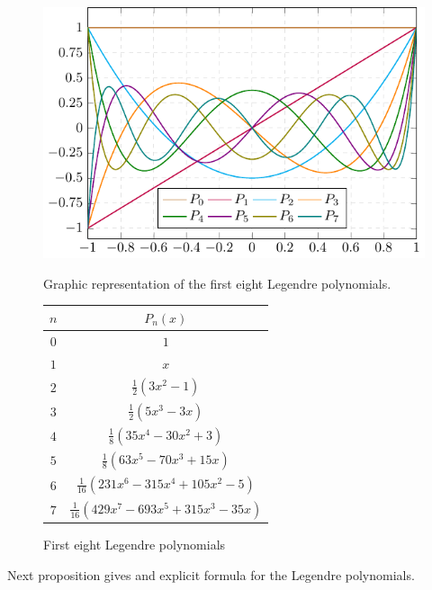 \documentclass[../main.tex]{subfiles}
\begin{document}
\begin{figure}[ht]
  \centering
  \begin{minipage}[ht]{0.45\textwidth}
    \centering
    \includegraphics[width=\textwidth]{Images/legendre.pdf}
    \caption{Graphic representation of the first eight Legendre polynomials.}
  \end{minipage}
  \hfill
  \begin{minipage}[ht]{0.45\textwidth}
    \centering
    \captionsetup{type=table} %
    \begin{tabular}{c|c}
      $n$ & $P_n(x)$                                 \\
      \hline\hline
      $0$ & $1$                                      \\
      $1$ & $x$                                      \\
      $2$ & $\frac{1}{2}(3x^2-1)$                    \\
      $3$ & $\frac{1}{2}(5x^3-3x)$                   \\
      $4$ & $\frac{1}{8}(35x^4-30x^2+3)$             \\
      $5$ & $\frac{1}{8}(63x^5-70x^3+15x)$           \\
      $6$ & $\frac{1}{16}(231x^6-315x^4+105x^2-5)$   \\
      $7$ & $\frac{1}{16}(429x^7-693x^5+315x^3-35x)$ \\
    \end{tabular}
    \caption{First eight Legendre polynomials}
    \label{tab:legendre_polys}
  \end{minipage}
\end{figure}
Next proposition gives and explicit formula for the Legendre polynomials.
\end{document}
